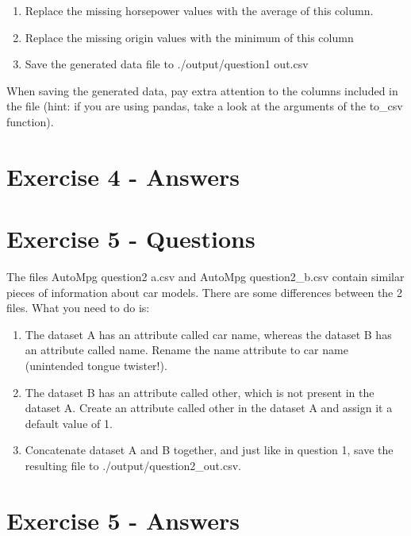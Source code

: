 \documentclass{scrreprt}
\begin{document}
\begin{enumerate}
\item Replace the missing horsepower values with the average of this column.
\item Replace the missing origin values with the minimum of this column
\item Save the generated data file to ./output/question1 out.csv
\end{enumerate}

When saving the generated data, pay extra attention to the columns included in the file (hint: if you are using pandas, take a look at the arguments of the to\_csv function).


\section{Exercise 4 - Answers}
	
	
	
	
	
	
	
	
\newpage
\section{Exercise 5 - Questions}

The files AutoMpg question2 a.csv and AutoMpg question2\_b.csv contain similar pieces of information about car models. There are some differences between the 2 files. What you need to do is:
\begin{enumerate}
\item The dataset A has an attribute called car name, whereas the dataset B has an attribute called name. Rename the name attribute to car name (unintended tongue twister!).
\item The dataset B has an attribute called other, which is not present in the dataset A. Create an attribute called other in the dataset A and assign it a default value of 1.
\item Concatenate dataset A and B together, and just like in question 1, save the resulting file to ./output/question2\_out.csv.
\end{enumerate}





\section{Exercise 5 - Answers}

	
\end{document}
